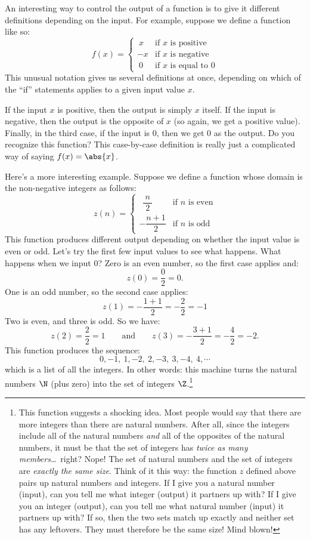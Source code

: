 An interesting way to control the output of a function is to give it different definitions depending on the input. For example, suppose we define a function like so:
\begin{equation*}
f(x) = \begin{cases}
~x	& \text{if $x$ is positive}
\\
-x	& \text{if $x$ is negative}
\\
~0	& \text{if $x$ is equal to 0}
\end{cases}
\end{equation*}
This unusual notation gives us several definitions at once, depending on which of the ``if'' statements applies to a given input value $x$.

If the input $x$ is positive, then the output is simply $x$ itself. If the input is negative, then the output is the opposite of $x$ (so again, we get a positive value). Finally, in the third case, if the input is 0, then we get 0 as the output. Do you recognize this function? This case-by-case definition is really just a complicated way of saying $f(x) = \abs{x}$.

Here's a more interesting example. Suppose we define a function whose domain is the non-negative integers as follows:
\begin{equation*}
z(n) = \begin{cases}
~~\dfrac{~n~}{2} & \text{if $n$ is even}
\\[3ex]
-\dfrac{n+1}{2} & \text{if $n$ is odd}
\end{cases}
\end{equation*}
This function produces different output depending on whether the input value is even or odd. Let's try the first few input values to see what happens. What happens when we input 0? Zero is an even number, so the first case applies and:
\[z(0) = \frac{0}{2} = 0.\]
One is an odd number, so the second case applies:
\[z(1) = -\frac{1+1}{2} = -\frac{2}{2} = -1\]
Two is even, and three is odd. So we have:
\[z(2) = \frac{2}{2} = 1 \qquad\text{and}\qquad z(3) = -\frac{3+1}{2} = -\frac{4}{2} = -2.\]
This function produces the sequence:
\[0, -1, ~1, -2, ~2, -3, ~3, -4, ~4,\cdots\]
which is a list of all the integers. In other words: this machine turns the natural numbers $\N$ (plus zero) into the set of integers $\Z$.\footnote{This function suggests a shocking idea. Most people would say that there are more integers than there are natural numbers. After all, since the integers include all of the natural numbers \textit{and} all of the opposites of the natural numbers, it must be that the set of integers has \textit{twice as many members}\ldots\ right? Nope! The set of natural numbers and the set of integers are \textit{exactly the same size}. Think of it this way: the function $z$ defined above pairs up natural numbers and integers. If I give you a natural number (input), can you tell me what integer (output) it partners up with? If I give you an integer (output), can you tell me what natural number (input) it partners up with? If so, then the two sets match up exactly and neither set has any leftovers. They must therefore be the same size! Mind blown!}

